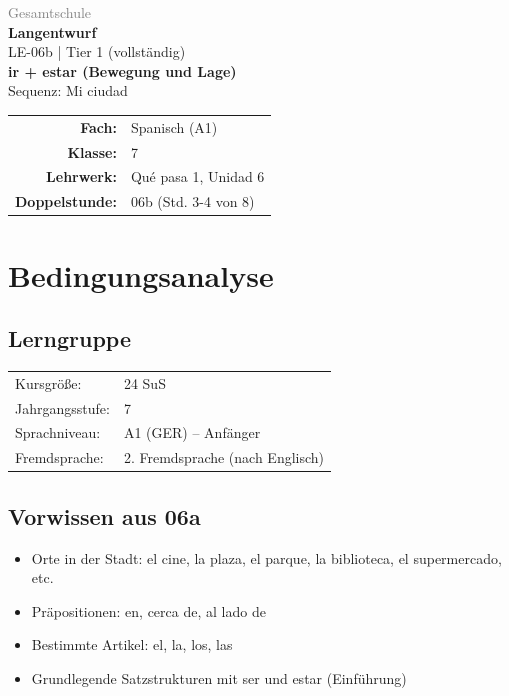 \documentclass[11pt,a4paper]{article}
\newcommand{\fach}{Spanisch}
\newcommand{\jahrgangsstufe}{7}
\newcommand{\schulart}{Gesamtschule}
\newcommand{\stundenthema}{ir + estar (Bewegung und Lage)}
\newcommand{\reihenthema}{Mi ciudad}
\newcommand{\stundennummer}{06b}
\newcommand{\gerniveau}{A1}
\newcommand{\lehrwerk}{Qué pasa 1}
\newcommand{\lehrwerkseite}{Unidad 6}
\newcommand{\lerngruppengroesse}{24}
\begin{document}
\begin{titlepage}
    \centering
    \vspace*{2cm}
    {\large\textcolor{gray}{\schulart}}\\[2cm]
    {\Huge\textcolor{fach}{\textbf{Langentwurf}}}\\[0.5cm]
    {\large LE-\stundennummer{} | Tier 1 (vollständig)}\\[2cm]
    {\LARGE\textbf{\stundenthema}}\\[0.5cm]
    {\large Sequenz: \reihenthema}\\[2cm]
    \begin{tabular}{rl}
        \textbf{Fach:} & \fach{} (\gerniveau) \\[0.3cm]
        \textbf{Klasse:} & \jahrgangsstufe \\[0.3cm]
        \textbf{Lehrwerk:} & \lehrwerk, \lehrwerkseite \\[0.3cm]
        \textbf{Doppelstunde:} & \stundennummer{} (Std. 3-4 von 8) \\[0.3cm]
    \end{tabular}
    \vfill
\end{titlepage}

\tableofcontents
\newpage

\section{Bedingungsanalyse}

\subsection{Lerngruppe}
\begin{tabular}{ll}
    Kursgröße: & \lerngruppengroesse{} SuS \\
    Jahrgangsstufe: & \jahrgangsstufe \\
    Sprachniveau: & \gerniveau{} (GER) -- Anfänger \\
    Fremdsprache: & 2. Fremdsprache (nach Englisch) \\
\end{tabular}

\subsection{Vorwissen aus 06a}
\begin{itemize}
    \item Orte in der Stadt: el cine, la plaza, el parque, la biblioteca, el supermercado, etc.
    \item Präpositionen: en, cerca de, al lado de
    \item Bestimmte Artikel: el, la, los, las
    \item Grundlegende Satzstrukturen mit ser und estar (Einführung)
\end{itemize}
\end{document}
